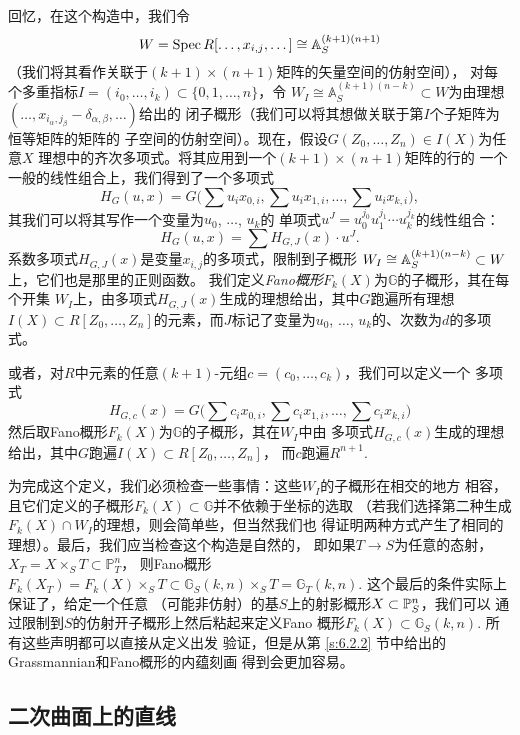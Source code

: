 回忆，在这个构造中，我们令
\[
	W=\spec R[\dots,x_{i,j},\dots]\cong \bba_S^{(k+1)(n+1)}
\]
（我们将其看作关联于$(k+1)\times (n+1)$矩阵的矢量空间的仿射空间），
对每个多重指标$I=(i_0,\dots,i_k)\subset \{0,1,\dots,n\}$，令
$W_I\cong \mathbb A_S^{(k+1)(n-k)}\subset W$为由理想
$(\dots,x_{i_\alpha,j_\beta}-\delta_{\alpha,\beta},\dots)$给出的
闭子概形（我们可以将其想做关联于第$I$个子矩阵为恒等矩阵的矩阵的
子空间的仿射空间）。现在，假设$G(Z_0,\dots,Z_n)\in I(X)$为任意$X$
理想中的齐次多项式。将其应用到一个$(k+1)\times (n+1)$矩阵的行的
一个一般的线性组合上，我们得到了一个多项式
\[
	H_G(u,x)=G\bigl(\sum u_ix_{0,i},\sum u_ix_{1,i},\dots,\sum u_ix_{k,i}\bigr),
\]
其我们可以将其写作一个变量为$u_0$, $\dots$, $u_k$的
单项式$u^J=u_0^{j_0}u_1^{j_1}\cdots u_k^{j_k}$的线性组合：
\[
	H_G(u,x)=\sum H_{G,J}(x)\cdot u^J.
\]
系数多项式$H_{G,J}(x)$是变量$x_{i,j}$的多项式，限制到子概形
$W_I\cong \A_S^{(k+1)(n-k)}\subset W$上，它们也是那里的正则函数。
我们定义\emph{Fano概形}$F_k(X)$为$\mathbb G$的子概形，其在每个开集
$W_I$上，由多项式$H_{G,J}(x)$生成的理想给出，其中$G$跑遍所有理想
$I(X)\subset R[Z_0,\dots,Z_n]$的元素，而$J$标记了变量为$u_0$, $\dots$, 
$u_k$的、次数为$d$的多项式。

或者，对$R$中元素的任意$(k+1)$-元组$c=(c_0,\dots,c_k)$，我们可以定义一个
多项式
\[
	H_{G,c}(x)=G\bigl(\sum c_ix_{0,i},\sum c_ix_{1,i},\dots,\sum c_ix_{k,i}\bigr)
\]
然后取Fano概形$F_k(X)$为$\mathbb G$的子概形，其在$W_I$中由
多项式$H_{G,c}(x)$生成的理想给出，其中$G$跑遍$I(X)\subset R[Z_0,\dots,Z_n]$，
而$c$跑遍$R^{n+1}$.


为完成这个定义，我们必须检查一些事情：这些$W_I$的子概形在相交的地方
相容，且它们定义的子概形$F_k(X)\subset \mathbb G$并不依赖于坐标的选取
（若我们选择第二种生成$F_k(X)\cap W_I$的理想，则会简单些，但当然我们也
得证明两种方式产生了相同的理想）。最后，我们应当检查这个构造是自然的，
即如果$T\to S$为任意的态射，$X_T=X\times_S T\subset \mathbb P_T^n$，
则Fano概形$F_k(X_T)=F_k(X)\times_S T\subset \mathbb G_S(k,n)\times_S T
=\mathbb G_{T}(k,n)$. 这个最后的条件实际上保证了，给定一个任意
（可能非仿射）的基$S$上的射影概形$X\subset \P_S^n$，我们可以
通过限制到$S$的仿射开子概形上然后粘起来定义Fano
概形$F_k(X)\subset \mathbb G_S(k,n)$. 所有这些声明都可以直接从定义出发
验证，但是从第 \ref{s:6.2.2} 节中给出的Grassmannian和Fano概形的内蕴刻画
得到会更加容易。

\subsection{二次曲面上的直线}\label{s:4.3.2}

